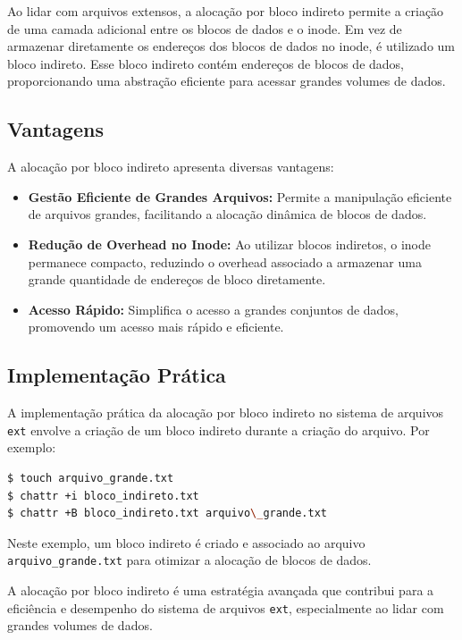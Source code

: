 \documentclass[
	12pt,				%
	openright,			%
	oneside,			%
	a4paper,			%
	chapter=TITLE,		%
	english,			%
	french,				%
	spanish,			%
	brazil				%
	]{abntex2}
\theoremstyle{definition}
\begin{document}
Ao lidar com arquivos extensos, a alocação por bloco indireto permite a criação de uma camada 
adicional entre os blocos de dados e o inode. Em vez de armazenar diretamente os endereços dos 
blocos de dados no inode, é utilizado um bloco indireto. Esse bloco indireto contém endereços 
de blocos de dados, proporcionando uma abstração eficiente para acessar grandes volumes de dados.

\subsection{Vantagens}
A alocação por bloco indireto apresenta diversas vantagens:

\begin{itemize}
    \item \textbf{Gestão Eficiente de Grandes Arquivos:} Permite a manipulação eficiente de arquivos grandes, facilitando a alocação dinâmica de blocos de dados.
    
    \item \textbf{Redução de Overhead no Inode:} Ao utilizar blocos indiretos, o inode permanece compacto, reduzindo o overhead associado a armazenar uma grande quantidade de endereços de bloco diretamente.
    
    \item \textbf{Acesso Rápido:} Simplifica o acesso a grandes conjuntos de dados, promovendo um acesso mais rápido e eficiente.
\end{itemize}

\subsection{Implementação Prática}
A implementação prática da alocação por bloco indireto no sistema de arquivos \texttt{ext} envolve a criação de um bloco indireto durante a criação do arquivo. Por exemplo:

\begin{lstlisting}[language=bash, caption={Exemplo de Alocação por Bloco Indireto}]
$ touch arquivo_grande.txt  
$ chattr +i bloco_indireto.txt  
$ chattr +B bloco_indireto.txt arquivo\_grande.txt  
\end{lstlisting}

Neste exemplo, um bloco indireto é criado e associado ao arquivo \texttt{arquivo\_grande.txt} para otimizar a alocação de blocos de dados.

A alocação por bloco indireto é uma estratégia avançada que contribui para a eficiência e desempenho do sistema de arquivos \texttt{ext}, especialmente ao lidar com grandes volumes de dados.
\end{document}
